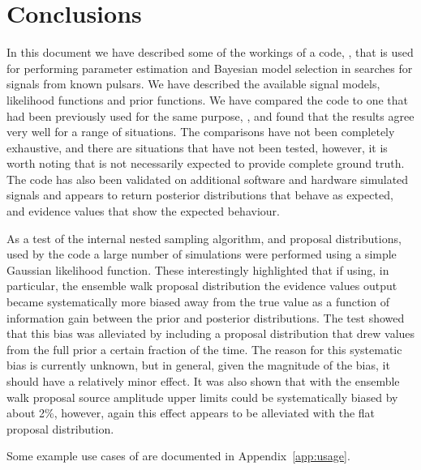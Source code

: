 \section{Conclusions}

In this document we have described some of the workings of a code, \lppenf, that is used for performing parameter estimation and Bayesian model
selection in searches for \gw signals from known pulsars. We have described the available signal models, likelihood functions and prior functions.
We have compared the code to one that had been previously used for the same purpose, \lppef, and found that the results agree very well for a range
of situations. The comparisons have not been completely exhaustive, and there are situations that have not been tested, however, it is worth noting
that \lppe is not necessarily expected to provide complete ground truth. The code has also been validated on additional software and hardware simulated
signals and appears to return posterior distributions that behave as expected, and evidence values that show the expected behaviour.

As a test of the internal nested sampling algorithm, and proposal distributions, used by the code a large number of simulations were performed using
a simple Gaussian likelihood function. These interestingly highlighted that if using, in particular, the ensemble walk proposal distribution the evidence
values output became systematically more biased away from the true value as a function of information gain between the prior and posterior distributions.
The test showed that this bias was alleviated by including a proposal distribution that drew values from the full prior a certain fraction of the time.
The reason for this systematic bias is currently unknown, but in general, given the magnitude of the bias, it should have a relatively minor effect. It was
also shown that with the ensemble walk proposal source amplitude upper limits could be systematically biased by about 2\%, however, again this effect
appears to be alleviated with the flat proposal distribution.

Some example use cases of \lppen are documented in Appendix~\ref{app:usage}.